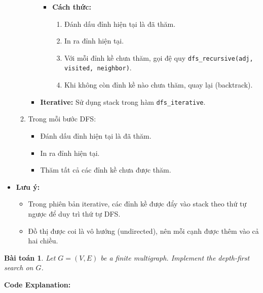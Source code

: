 \documentclass{article}
\newtheorem{baitoan}{Bài toán}
\begin{document}
\begin{itemize}
\begin{enumerate}
\begin{itemize}
            \begin{itemize}
                \item \textbf{Cách thức:} 
                \begin{enumerate}
                    \item Đánh dấu đỉnh hiện tại là đã thăm.
                    \item In ra đỉnh hiện tại.
                    \item Với mỗi đỉnh kề chưa thăm, gọi đệ quy \texttt{dfs\_recursive(adj, visited, neighbor)}.
                    \item Khi không còn đỉnh kề nào chưa thăm, quay lại (backtrack).
                \end{enumerate}
            \end{itemize}
            \item \textbf{Iterative:} Sử dụng stack trong hàm \texttt{dfs\_iterative}.
        \end{itemize}
        \item Trong mỗi bước DFS:
        \begin{itemize}
            \item Đánh dấu đỉnh hiện tại là đã thăm.
            \item In ra đỉnh hiện tại.
            \item Thăm tất cả các đỉnh kề chưa được thăm.
        \end{itemize}
    \end{enumerate}
    \item \textbf{Lưu ý:} 
    \begin{itemize}
        \item Trong phiên bản iterative, các đỉnh kề được đẩy vào stack theo thứ tự ngược để duy trì thứ tự DFS.
        \item Đồ thị được coi là vô hướng (undirected), nên mỗi cạnh được thêm vào cả hai chiều.
    \end{itemize}
\end{itemize}

\begin{baitoan}
    Let $G = (V,E)$ be a finite multigraph. Implement the depth-first search on $G$.
\end{baitoan}


\textbf{Code Explanation:}
\end{document}
